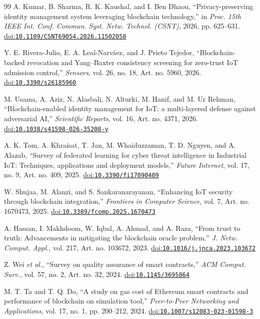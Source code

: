 \begin{thebibliography}{99}
A. Kumar, B. Sharma, R. K. Kaushal, and I. Ben Dhaou, ``Privacy-preserving identity management system leveraging blockchain technology,'' in \emph{Proc. 15th IEEE Int. Conf. Commun. Syst. Netw. Technol. (CSNT)}, 2026, pp. 625--631. \href{https://doi.org/10.1109/CSNT69054.2026.11502058}{doi:\nolinkurl{10.1109/CSNT69054.2026.11502058}}

Y. E. Rivera-Julio, E. A. Leal-Narv\'aez, and J. Prieto Tejedor, ``Blockchain-backed revocation and Yang--Baxter consistency screening for zero-trust IoT admission control,'' \emph{Sensors}, vol. 26, no. 18, Art. no. 5960, 2026. \href{https://doi.org/10.3390/s26185960}{doi:\nolinkurl{10.3390/s26185960}}

M. Usama, A. Aziz, N. Alasbali, N. Alturki, M. Hanif, and M. Ur Rehman, ``Blockchain-enabled identity management for IoT: a multi-layered defense against adversarial AI,'' \emph{Scientific Reports}, vol. 16, Art. no. 4371, 2026. \href{https://doi.org/10.1038/s41598-026-35208-y}{doi:\nolinkurl{10.1038/s41598-026-35208-y}}

A. K. Tom, A. Khraisat, T. Jan, M. Whaiduzzaman, T. D. Nguyen, and A. Alazab, ``Survey of federated learning for cyber threat intelligence in Industrial IoT: Techniques, applications and deployment models,'' \emph{Future Internet}, vol. 17, no. 9, Art. no. 409, 2025. \href{https://doi.org/10.3390/fi17090409}{doi:\nolinkurl{10.3390/fi17090409}}

W. Shujaa, M. Alanzi, and S. Sankaranarayanan, ``Enhancing IoT security through blockchain integration,'' \emph{Frontiers in Computer Science}, vol. 7, Art. no. 1670473, 2025. \href{https://doi.org/10.3389/fcomp.2025.1670473}{doi:\nolinkurl{10.3389/fcomp.2025.1670473}}

A. Hassan, I. Makhdoom, W. Iqbal, A. Ahmad, and A. Raza, ``From trust to truth: Advancements in mitigating the blockchain oracle problem,'' \emph{J. Netw. Comput. Appl.}, vol. 217, Art. no. 103672, 2023. \href{https://doi.org/10.1016/j.jnca.2023.103672}{doi:\nolinkurl{10.1016/j.jnca.2023.103672}}

Z. Wei \emph{et al.}, ``Survey on quality assurance of smart contracts,'' \emph{ACM Comput. Surv.}, vol. 57, no. 2, Art. no. 32, 2024. \href{https://doi.org/10.1145/3695864}{doi:\nolinkurl{10.1145/3695864}}

M. T. Ta and T. Q. Do, ``A study on gas cost of Ethereum smart contracts and performance of blockchain on simulation tool,'' \emph{Peer-to-Peer Networking and Applications}, vol. 17, no. 1, pp. 200--212, 2024. \href{https://doi.org/10.1007/s12083-023-01598-3}{doi:\nolinkurl{10.1007/s12083-023-01598-3}}


\end{thebibliography}

